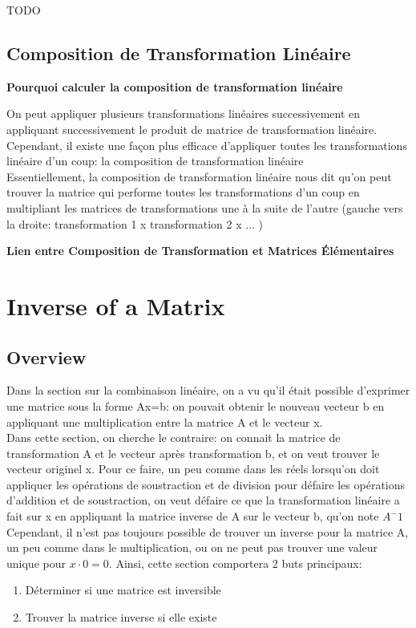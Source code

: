 \documentclass{article}
\begin{document}
TODO

\subsection{Composition de Transformation Linéaire}

\textbf{Pourquoi calculer la composition de transformation linéaire}

On peut appliquer plusieurs transformations linéaires successivement en
appliquant successivement le produit de matrice de transformation linéaire.
Cependant, il existe une façon plus efficace d'appliquer toutes les
transformations linéaire d'un coup: la composition de transformation linéaire\\

Essentiellement, la composition de transformation linéaire nous dit qu'on peut
trouver la matrice qui performe toutes les transformations d'un coup en
multipliant les matrices de transformations une à la suite de l'autre (gauche
vers la droite: transformation 1 x transformation 2 x ... )

\textbf{Lien entre Composition de Transformation et Matrices Élémentaires}

\section{Inverse of a Matrix}

\subsection{Overview}%
\label{sub:Overview}

Dans la section sur la combinaison linéaire, on a vu qu'il était possible
d'exprimer une matrice sous la forme Ax=b: on pouvait obtenir le nouveau
vecteur b en appliquant une multiplication entre la matrice A et le vecteur x.\\

Dans cette section, on cherche le contraire: on connait la matrice de
transformation A et le vecteur après transformation b, et on veut trouver le
vecteur originel x. Pour ce faire, un peu comme dans les réels lorsqu'on
doit appliquer les opérations de soustraction et de division pour défaire
les opérations d'addition et de soustraction, on veut défaire ce que la
transformation linéaire a fait sur x en appliquant la matrice inverse de A sur
le vecteur b, qu'on note $A^-1$\\

Cependant, il n'est pas toujours possible de trouver un inverse pour la matrice
A, un peu comme dans le multiplication, ou on ne peut pas trouver une valeur
unique pour $ x \cdot 0 = 0 $. Ainsi, cette section comportera 2 buts
principaux:
\begin{enumerate}
    \item Déterminer si une matrice est inversible
    \item Trouver la matrice inverse si elle existe
\end{enumerate}
\end{document}
